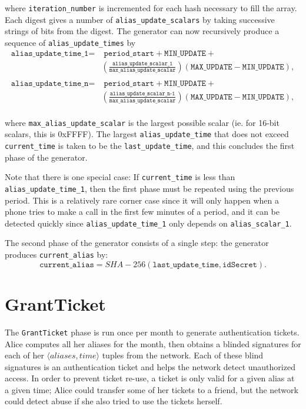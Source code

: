 \documentclass[11pt]{article}
\begin{document}
where \texttt{iteration_number} is incremented for each hash necessary to fill the array. Each digest gives a number of \texttt{alias_update_scalars} by taking successive strings of bits from the digest. The generator can now recursively produce a sequence of \texttt{alias_update_times} by
\begin{equation*}
\begin{split}
\texttt{alias_update_time_1} =  &\;  \texttt{period_start} + \texttt{MIN_UPDATE}  + \\ 
	& (\frac{\texttt{alias_update_scalar_1}}{\texttt{max_alias_update_scalar}}) (\texttt{MAX_UPDATE} - \texttt{MIN_UPDATE}), \\
\end{split}
\end{equation*}
\begin{equation*}
\begin{split}
	\texttt{alias_update_time_n} =  &\;  \texttt{period_start} + \texttt{MIN_UPDATE}  + \\ 
	& (\frac{\texttt{alias_update_scalar_n-1}}{\texttt{max_alias_update_scalar}}) (\texttt{MAX_UPDATE} - \texttt{MIN_UPDATE}), \\
\end{split}
\end{equation*}
	  
where \texttt{max_alias_update_scalar} is the largest possible scalar (ie. for 16-bit scalars, this is 0xFFFF). The largest \texttt{alias_update_time} that does not exceed \texttt{current_time} is taken to be the \texttt{last_update_time}, and this concludes the first phase of the generator.

Note that there is one special case: If \texttt{current_time} is less than \texttt{alias_update_time_1}, then the first phase must be repeated using the previous period. This is a relatively rare corner case since it will only happen when a phone tries to make a call in the first few minutes of a period, and it can be detected quickly since \texttt{alias_update_time_1} only depends on \texttt{alias_scalar_1}.
	    
The second phase of the generator consists of a single step: the generator produces \texttt{current_alias} by:
\begin{equation*}
	\texttt{current_alias} = SHA-256(\texttt{last_update_time}, \texttt{idSecret}).
\end{equation*}

\section{GrantTicket}
The \texttt{GrantTicket} phase is run once per month to generate authentication tickets. Alice computes all her aliases for the month, then obtains a blinded signatures for each of her \texttt{$\langle aliases, time \rangle$} tuples from the network. Each of these blind signatures is an authentication ticket and helps the network detect unauthorized access. In order to prevent ticket re-use, a ticket is only valid for a given alias at a given time; Alice could transfer some of her tickets to a friend, but the network could detect abuse if she also tried to use the tickets herself.
\end{document}
